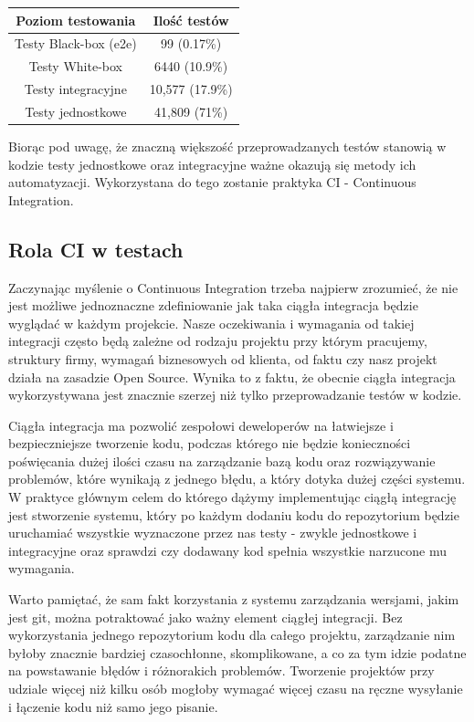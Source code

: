 \begin{center}
\begin{tabular}{ |c|c| } 
 \hline
 Poziom testowania & Ilość testów  \\ 
  \hline
 Testy Black-box (e2e)  & 99 (0.17\%) \\ 
 Testy White-box  & 6440 (10.9\%) \\ 
 Testy integracyjne & 10,577 (17.9\%)  \\ 
 Testy jednostkowe & 41,809 (71\%)  \\ 
 \hline
\end{tabular}
\end{center}

Biorąc pod uwagę, że znaczną większość przeprowadzanych testów stanowią w kodzie testy jednostkowe oraz integracyjne ważne okazują się metody ich automatyzacji. Wykorzystana do tego zostanie praktyka CI - Continuous Integration. 

\subsection{Rola CI w testach}
Zaczynając myślenie o Continuous Integration trzeba najpierw zrozumieć, że nie jest możliwe jednoznaczne zdefiniowanie jak taka ciągła integracja będzie wyglądać w każdym projekcie. Nasze oczekiwania i wymagania od takiej integracji często będą zależne od rodzaju projektu przy którym pracujemy, struktury firmy, wymagań biznesowych od klienta, od faktu czy nasz projekt działa na zasadzie Open Source. Wynika to z faktu, że obecnie ciągła integracja wykorzystywana jest znacznie szerzej niż tylko przeprowadzanie testów w kodzie. 

Ciągła integracja ma pozwolić zespołowi deweloperów na łatwiejsze i bezpieczniejsze tworzenie kodu, podczas którego nie będzie konieczności poświęcania dużej ilości czasu na zarządzanie bazą kodu oraz rozwiązywanie problemów, które wynikają z jednego błędu, a który dotyka dużej części systemu. W praktyce głównym celem do którego dążymy implementując ciągłą integrację jest stworzenie systemu, który po każdym dodaniu kodu do repozytorium będzie uruchamiać wszystkie wyznaczone przez nas testy - zwykle jednostkowe i integracyjne oraz sprawdzi czy dodawany kod spełnia wszystkie narzucone mu wymagania. 

Warto pamiętać, że sam fakt korzystania z systemu zarządzania wersjami, jakim jest git, można potraktować jako ważny element ciągłej integracji. Bez wykorzystania jednego repozytorium kodu dla całego projektu, zarządzanie nim byłoby znacznie bardziej czasochłonne, skomplikowane, a co za tym idzie podatne na powstawanie błędów i różnorakich problemów. Tworzenie projektów przy udziale więcej niż kilku osób mogłoby wymagać więcej czasu na ręczne wysyłanie i łączenie kodu niż samo jego pisanie. 

